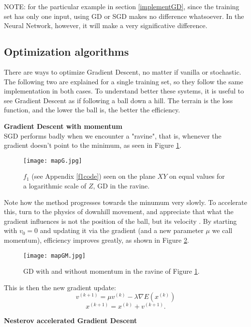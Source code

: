 \documentclass[titlepage]{article}
\theoremstyle{plain}
\theoremstyle{definition}
\begin{document}
		NOTE: for the particular example in section \ref{implementGD}, since the training set has only one input, using GD or SGD makes no difference whatsoever. In the Neural Network, however, it will make a very significative difference.
		
		\subsection{Optimization algorithms}\label{optimGD}
		
		There are ways to optimize Gradient Descent, no matter if vanilla or stochastic. The following two are explained for a single training set, so they follow the same implementation in both cases. To understand better these systems, it is useful to see Gradient Descent as if following a ball down a hill. The terrain is the loss function, and the lower the ball is, the better the efficiency.
		
		\textbf{Gradient Descent with momentum}\\
		
		SGD performs badly when we encounter a "ravine", that is, whenever the gradient doesn't point to the minimum, as seen in Figure \ref{fig:mapG}.
		\begin{figure}[H]
			\centering
			\texttt{[image: mapG.jpg]}
			\caption{$f_1$ (see Appendix \ref{f1code}) seen on the plane $XY$ on equal values for a logarithmic scale of $Z$, GD in the ravine.}
			\label{fig:mapG}
		\end{figure}
		Note how the method progresses towards the minumum very slowly. To accelerate this, turn to the physics of downhill movement, and appreciate that what the gradient influences is not the position of the ball, but its velocity \cite{Karpathy}. By starting with $v_0 = 0$ and updating it via the gradient (and a new parameter $\mu$ we call momentum), efficiency improves greatly, as shown in Figure \ref{fig:mapGM}.
		\begin{figure}[H]
			\centering
			\texttt{[image: mapGM.jpg]}
			\caption{GD with and without momentum in the ravine of Figure \ref{fig:mapG}.}
			\label{fig:mapGM}
		\end{figure}
		This is then the new gradient update:
		$$
		v^{(k+1)} = \mu v^{(k)} - \lambda \nabla E(x^{(k)})
		$$ $$
		x^{(k+1)} = x^{(k)} + v^{(k+1)}.
		$$
		
		\textbf{Nesterov accelerated Gradient Descent}\\
		
\end{document}
